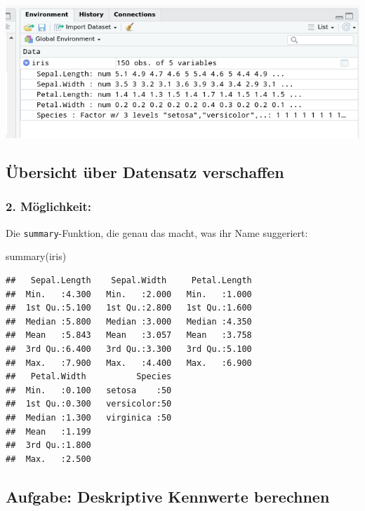 \documentclass[
]{book}
\newenvironment{Shaded}{\begin{snugshade}}{\end{snugshade}}
\newcommand{\FunctionTok}[1]{\textcolor[rgb]{0.00,0.00,0.00}{#1}}
\newcommand{\NormalTok}[1]{#1}
\begin{document}
\begin{center}\includegraphics[width=1\linewidth]{imgs/summ2} \end{center}

\hypertarget{uxfcbersicht-uxfcber-datensatz-verschaffen-1}{%
\subsection{Übersicht über Datensatz verschaffen}\label{uxfcbersicht-uxfcber-datensatz-verschaffen-1}}

\hypertarget{muxf6glichkeit-1}{%
\subsubsection{2. Möglichkeit:}\label{muxf6glichkeit-1}}

Die \texttt{summary}-Funktion, die genau das macht, was ihr Name suggeriert:

\begin{Shaded}
\begin{Highlighting}[]
\FunctionTok{summary}\NormalTok{(iris)}
\end{Highlighting}
\end{Shaded}

\begin{verbatim}
##   Sepal.Length    Sepal.Width     Petal.Length  
##  Min.   :4.300   Min.   :2.000   Min.   :1.000  
##  1st Qu.:5.100   1st Qu.:2.800   1st Qu.:1.600  
##  Median :5.800   Median :3.000   Median :4.350  
##  Mean   :5.843   Mean   :3.057   Mean   :3.758  
##  3rd Qu.:6.400   3rd Qu.:3.300   3rd Qu.:5.100  
##  Max.   :7.900   Max.   :4.400   Max.   :6.900  
##   Petal.Width          Species  
##  Min.   :0.100   setosa    :50  
##  1st Qu.:0.300   versicolor:50  
##  Median :1.300   virginica :50  
##  Mean   :1.199                  
##  3rd Qu.:1.800                  
##  Max.   :2.500
\end{verbatim}

\hypertarget{aufgabe-deskriptive-kennwerte-berechnen}{%
\subsection{Aufgabe: Deskriptive Kennwerte berechnen}\label{aufgabe-deskriptive-kennwerte-berechnen}}
\end{document}
